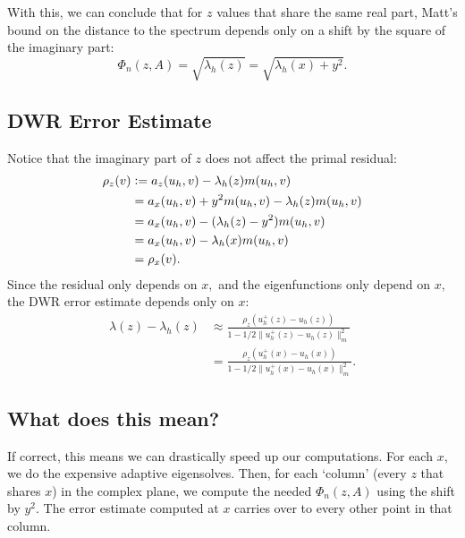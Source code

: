 \documentclass[12pt,a4paper]{article}
\newcommand{\defeq}{\vcentcolon=}
\begin{document}
With this, we can conclude that for $z$ values that share the same real part, Matt's bound on the distance to the spectrum depends only on a shift by the square of the imaginary part:
\begin{equation}
    \Phi_n(z, A) = \sqrt{\lambda_h(z)} = \sqrt{\lambda_h(x) + y^2}.
\end{equation}


\subsection{DWR Error Estimate}

Notice that the imaginary part of $z$ does not affect the primal residual:
\begin{align}
    \rho_z(v) &\defeq a_z(u_h, v) - \lambda_h(z) m(u_h, v) \\
    &= a_x(u_h, v) + y^2 m(u_h, v) - \lambda_h(z) m(u_h, v) \\
    &= a_x(u_h, v) - (\lambda_h(z) - y^2) m(u_h, v) \\
    &= a_x(u_h, v) - \lambda_h(x) m(u_h, v) \\
    &= \rho_x(v).  
\end{align}
Since the residual only depends on $x,$ and the eigenfunctions only depend on $x,$ the DWR error estimate depends only on $x$:
\begin{align}
    \lambda(z) - \lambda_h(z) &\approx \frac{\rho_z(u_h^+(z) - u_h(z))}{1 - 1/2 \| u_h^+(z) - u_h(z) \|_m^2 }\\
    &= \frac{\rho_z(u_h^+(x) - u_h(x))}{1 - 1/2 \| u_h^+(x) - u_h(x) \|_m^2 }.
\end{align}


\subsection{What does this mean?}

If correct, this means we can drastically speed up our computations. For each $x,$ we do the expensive adaptive eigensolves. Then, for each `column' (every $z$ that shares $x$) in the complex plane, we compute the needed $\Phi_n(z, A)$ using the shift by $y^2.$ The error estimate computed at $x$ carries over to every other point in that column.



\end{document}
